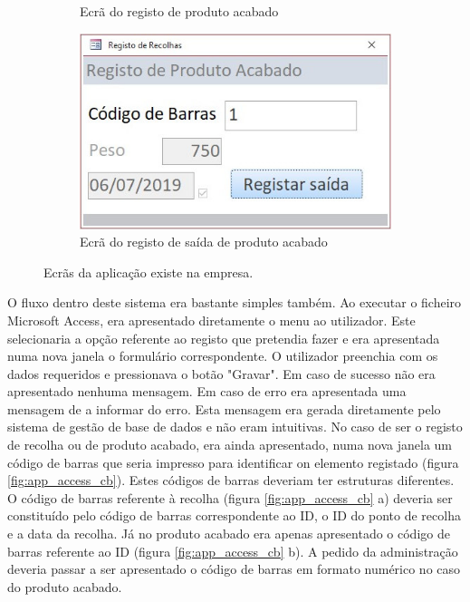 \begin{figure}[h!]
\begin{subfigure}[c]{0.3\linewidth}
		\caption{Ecrã do registo de produto acabado}
	\end{subfigure}
	\begin{subfigure}[c]{0.3\linewidth}
		\includegraphics[width=\linewidth]{figuras/AppAccess/5-SaidaProdutoAcabado.jpg}
		\caption{Ecrã do registo de saída de produto acabado}
	\end{subfigure}
	
	\caption{Ecrãs da aplicação existe na empresa.}
	\label{fig:app_access}
\end{figure}

O fluxo dentro deste sistema era bastante simples também. Ao executar o ficheiro Microsoft Access, era apresentado diretamente o menu ao utilizador. Este selecionaria a opção referente ao registo que pretendia fazer e era apresentada numa nova janela o formulário correspondente. O utilizador preenchia com os dados requeridos e pressionava o botão "Gravar". Em caso de sucesso não era apresentado nenhuma mensagem. Em caso de erro era apresentada uma mensagem de a informar do erro. Esta mensagem era gerada diretamente pelo sistema de gestão de base de dados e não eram intuitivas. No caso de ser o registo de recolha ou de produto acabado, era ainda apresentado, numa nova janela um código de barras que seria impresso para identificar on elemento registado (figura \ref{fig:app_access_cb}). Estes códigos de barras deveriam ter estruturas diferentes. O código de barras referente à recolha (figura \ref{fig:app_access_cb} a) deveria ser constituído pelo código de barras correspondente ao ID, o ID do ponto de recolha e a data da recolha. Já no produto acabado era apenas apresentado o código de barras referente ao ID (figura \ref{fig:app_access_cb} b). A pedido da administração deveria passar a ser apresentado o código de barras em formato numérico no caso do produto acabado.

